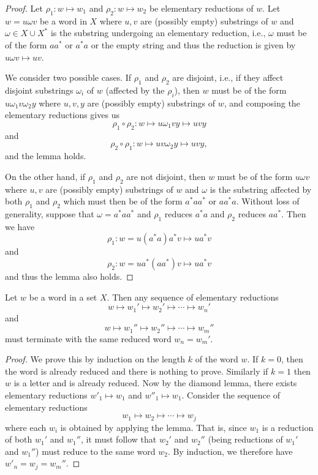 \begin{proof}
    Let \(\rho_1 : w \mapsto w_1\) and \(\rho_2 : w \mapsto w_2\) be elementary
    reductions of \(w\). Let \(w = u\omega v\) be a word in \(X\) where \(u, v\)
    are (possibly empty) substrings of \(w\) and \(\omega \in X \cup X^*\) is
    the substring undergoing an elementary reduction, i.e., \(\omega\) must be
    of the form \(aa^*\) or \(a^*a\) or the empty string and thus the reduction
    is given by \(u\omega v \mapsto uv\).

    We consider two possible cases. If \(\rho_1\) and \(\rho_2\) are disjoint,
    i.e., if they affect disjoint substrings \(\omega_i\) of \(w\) (affected by
    the \(\rho_i\)), then \(w\) must be of the form \(u\omega_1v\omega_2y\)
    where \(u, v, y\) are (possibly empty) substrings of \(w\), and composing
    the elementary reductions gives us
    \[
        \rho_1 \circ \rho_2 : w \mapsto u\omega_1vy \mapsto uvy
    \]
    and 
    \[
        \rho_2 \circ \rho_1 : w \mapsto uv\omega_2y \mapsto uvy,
    \]
    and the lemma holds.

    On the other hand, if \(\rho_1\) and \(\rho_2\) are not disjoint, then \(w\)
    must be of the form \(u\omega v\) where \(u, v\) are (possibly empty)
    substrings of \(w\) and \(\omega\) is the substring affected by both
    \(\rho_1\) and \(\rho_2\) which must then be of the form \(a^*aa^*\) or
    \(aa^*a\). Without loss of generality, suppose that \(\omega = a^*aa^*\) and
    \(\rho_1\) reduces \(a^*a\) and \(\rho_2\) reduces \(aa^*\). Then we have
    \[
        \rho_1 : w = u(a^*a)a^*v \mapsto ua^*v
    \]
    and
    \[
        \rho_2 : w = ua^*(aa^*)v \mapsto ua^*v
    \]
    and thus the lemma also holds.
\end{proof}

\begin{theorem}
    Let \(w\) be a word in a set \(X\). Then any sequence of elementary
    reductions
    \[
        w \mapsto w_1' \mapsto w_2' \mapsto \cdots \mapsto w_n'
    \]
    and
    \[
        w  \mapsto w_1'' \mapsto w_2'' \mapsto \cdots \mapsto w_m''
    \]
    must terminate with the same reduced word \(w_n = w_m'\).
\end{theorem}

\begin{proof}
    We prove this by induction on the length \(k\) of the word \(w\). If \(k =
    0\), then the word is already reduced and there is nothing to prove.
    Similarly if \(k = 1\) then \(w\) is a letter and is already reduced. Now by
    the diamond lemma, there exists elementary reductions \(w'_1 \mapsto w_1\)
    and \(w''_1 \mapsto w_1\). Consider the sequence of elementary reductions
    \[
        w_1 \mapsto w_2 \mapsto \cdots \mapsto w_j
    \]
    where each \(w_i\) is obtained by applying the lemma. That is, since \(w_1\)
    is a reduction of both \(w_1'\) and \(w_1''\), it must follow that \(w_2'\)
    and \(w_2''\) (being reductions of \(w_1'\) and \(w_1''\)) must reduce to
    the same word \(w_2\). By induction, we therefore have \(w'_n = w_j =
    w_m''\).
\end{proof}

